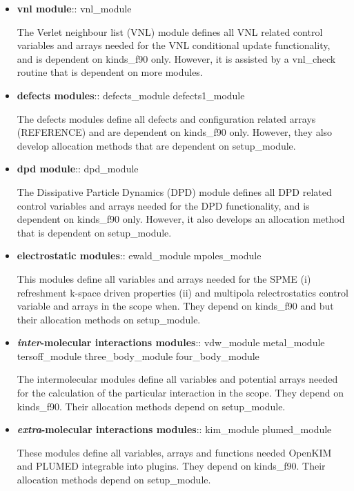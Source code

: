 \begin{itemize}
\item {\bf vnl module}:: {\sc vnl\_module}

The Verlet neighbour list (VNL) module defines all VNL related
control variables and arrays needed for the VNL conditional
update functionality, and is dependent on {\sc kinds\_f90} only.
However, it is assisted by a {\sc vnl\_check} routine that is
dependent on more modules.

\item {\bf defects modules}:: {\sc defects\_module defects1\_module}

The defects modules define all defects and configuration related
arrays (REFERENCE) and are dependent on {\sc kinds\_f90} only.
However, they also develop allocation methods that are dependent
on {\sc setup\_module}.

\item {\bf dpd module}:: {\sc dpd\_module}

The Dissipative Particle Dynamics (DPD) module defines all DPD related
control variables and arrays needed for the DPD functionality, and is
dependent on {\sc kinds\_f90} only.  However, it also develops an
allocation method that is dependent on {\sc setup\_module}.

\item {\bf electrostatic modules}:: {\sc ewald\_module mpoles\_module}

This modules define all variables and arrays needed for the
SPME (i) refreshment k-space driven properties (ii) and
multipola relectrostatics control variable and arrays in the
\D scope when.  They depend on {\sc kinds\_f90} and but their
allocation methods on {\sc setup\_module}.

\item {\bf {\em inter}-molecular interactions modules}:: {\sc
vdw\_module metal\_module \\
tersoff\_module three\_body\_module four\_body\_module}

The intermolecular modules define all variables and potential
arrays needed for the calculation of the particular interaction in
the \D scope.  They depend on {\sc kinds\_f90}.  Their allocation
methods depend on {\sc setup\_module}.

\item {\bf {\em extra}-molecular interactions modules}:: {\sc
kim\_module plumed\_module}

These modules define all variables, arrays and functions needed
OpenKIM and PLUMED integrable into \D plugins.  They depend on
{\sc kinds\_f90}.  Their allocation methods depend on {\sc setup\_module}.


\end{itemize}
